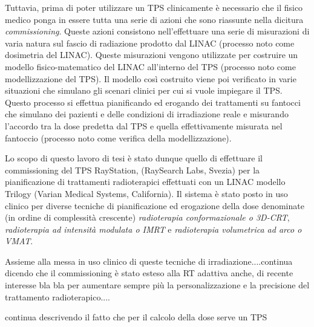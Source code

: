 Tuttavia, prima di poter utilizzare un TPS clinicamente è necessario che il fisico medico ponga in essere tutta una serie di azioni che sono riassunte nella dicitura \textit{commissioning}. Queste azioni consistono nell'effettuare una serie di misurazioni di varia natura sul fascio di radiazione prodotto dal LINAC (processo noto come dosimetria del LINAC). Queste misurazioni vengono utilizzate per costruire un modello fisico-matematico del LINAC all'interno del TPS (processo noto come modellizzazione del TPS). Il modello così costruito viene poi verificato in varie situazioni che simulano gli scenari clinici per cui si vuole impiegare il TPS. Questo processo si effettua pianificando ed erogando dei trattamenti su fantocci che simulano dei pazienti e delle condizioni di irradiazione reale e misurando l'accordo tra la dose predetta dal TPS e quella effettivamente misurata nel fantoccio (processo noto come verifica della modellizzazione).

Lo scopo di questo lavoro di tesi è stato dunque quello di effettuare il commissioning del TPS RayStation, (RaySearch Labs, Svezia) per la pianificazione di trattamenti radioterapici effettuati con un LINAC modello Trilogy (Varian Medical Systems, California). Il sistema è stato posto in uso clinico per diverse tecniche di pianificazione ed erogazione della dose denominate (in ordine di complessità crescente) \textit{radioterapia conformazionale o 3D-CRT}, \textit{radioterapia ad intensità modulata o IMRT} e \textit{radioterapia volumetrica ad arco o VMAT}.

Assieme alla messa in uso clinico di queste tecniche di irradiazione....continua dicendo che il commissioning è stato esteso alla RT adattiva anche, di recente interesse bla bla per aumentare sempre più la personalizzazione e la precisione del trattamento radioterapico....

continua descrivendo il fatto che per il calcolo della dose serve un TPS